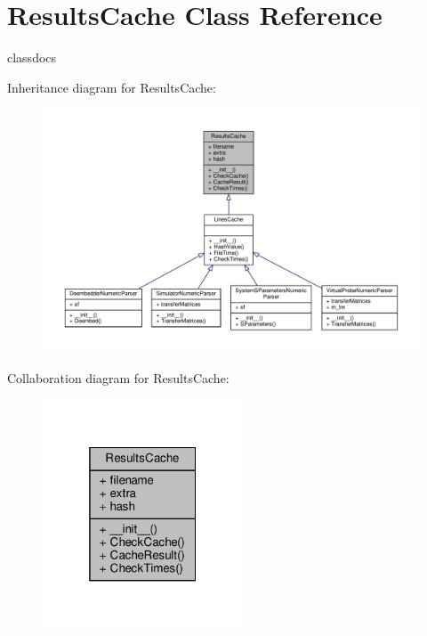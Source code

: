 \hypertarget{classSignalIntegrity_1_1ResultsCache_1_1ResultsCache}{}\section{Results\+Cache Class Reference}
\label{classSignalIntegrity_1_1ResultsCache_1_1ResultsCache}


classdocs  




Inheritance diagram for Results\+Cache\+:\nopagebreak
\begin{figure}[H]
\begin{center}
\leavevmode
\includegraphics[width=350pt]{classSignalIntegrity_1_1ResultsCache_1_1ResultsCache__inherit__graph}
\end{center}
\end{figure}


Collaboration diagram for Results\+Cache\+:\nopagebreak
\begin{figure}[H]
\begin{center}
\leavevmode
\includegraphics[width=169pt]{classSignalIntegrity_1_1ResultsCache_1_1ResultsCache__coll__graph}
\end{center}
\end{figure}
